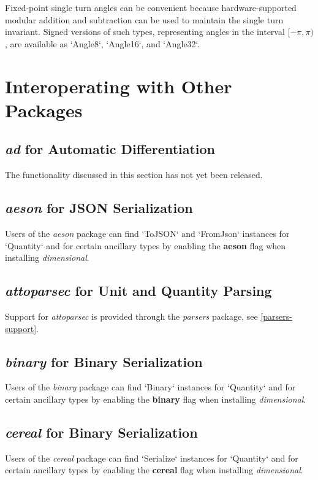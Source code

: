 \documentclass[11pt]{report}
\newcommand{\packagename}[1]{\textit{#1}}
\newcommand{\thispackage}{\packagename{dimensional}}
\newcommand{\flag}[1]{\textbf{#1}}
\newcommand{\prerelease}{\begin{framed}
The functionality discussed in this section has not yet been released.
\end{framed}}
\begin{document}
Fixed-point single turn angles can be convenient because hardware-supported modular addition and subtraction can be used to maintain the
single turn invariant. Signed versions of such types, representing angles in the interval $ [-\pi, \pi) $, are available as `Angle8`, `Angle16`,
and `Angle32`.




\chapter{Interoperating with Other Packages}

\section{\packagename{ad} for Automatic Differentiation}

\prerelease{}

\section{\packagename{aeson} for JSON Serialization}

Users of the \packagename{aeson} package can find `ToJSON`
and `FromJson` instances for `Quantity` and for certain ancillary types by
enabling the \flag{aeson} flag when installing \thispackage{}.

\section{\packagename{attoparsec} for Unit and Quantity Parsing}

Support for \packagename{attoparsec} is provided through the \packagename{parsers} package, see \ref{parsers-support}.

\section{\packagename{binary} for Binary Serialization}

Users of the \packagename{binary} package can find `Binary`
instances for `Quantity` and for certain ancillary types by
enabling the \flag{binary} flag when installing \thispackage{}.

\section{\packagename{cereal} for Binary Serialization}

Users of the \packagename{cereal} package can find `Serialize`
instances for `Quantity` and for certain ancillary types by
enabling the \flag{cereal} flag when installing \thispackage{}.
\end{document}
